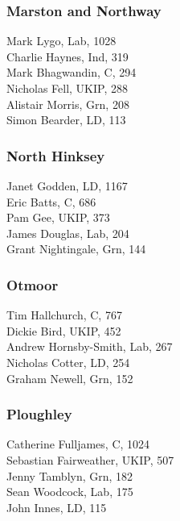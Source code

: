 \documentclass[a4paper,openany,10pt]{book}
\begin{document}
\subsubsection*{Marston and Northway}



Mark Lygo, Lab, 1028\\
Charlie Haynes, Ind, 319\\
Mark Bhagwandin, C, 294\\
Nicholas Fell, UKIP, 288\\
Alistair Morris, Grn, 208\\
Simon Bearder, LD, 113\\


\subsubsection*{North Hinksey}



Janet Godden, LD, 1167\\
Eric Batts, C, 686\\
Pam Gee, UKIP, 373\\
James Douglas, Lab, 204\\
Grant Nightingale, Grn, 144\\


\subsubsection*{Otmoor}



Tim Hallchurch, C, 767\\
Dickie Bird, UKIP, 452\\
{Andrew Hornsby-Smith}, Lab, 267\\
Nicholas Cotter, LD, 254\\
Graham Newell, Grn, 152\\


\subsubsection*{Ploughley}



Catherine Fulljames, C, 1024\\
Sebastian Fairweather, UKIP, 507\\
Jenny Tamblyn, Grn, 182\\
Sean Woodcock, Lab, 175\\
John Innes, LD, 115\\
\end{document}
